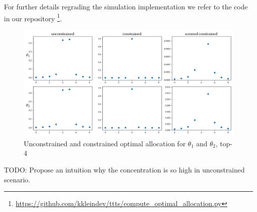 For further details regrading the simulation implementation we refer to the code in our repository \footnote{\url{https://github.com/kkleindev/ttts/compute_optimal_allocation.py}}.

\begin{figure}[h]
  \centering
  \includegraphics[width=\textwidth]{optimal_allocation.png}
  \caption{Unconstrained and constrained optimal allocation for $\theta_1$ and $\theta_2$, top-4}
  \label{fig:optimal_allocation}
\end{figure}

TODO: Propose an intuition why the concentration is so high in unconstrained scenario.

